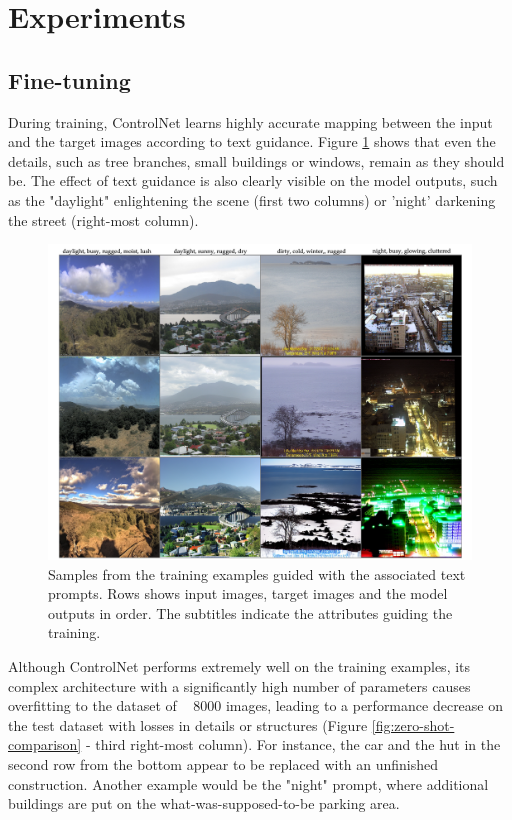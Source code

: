 \section{Experiments}\label{zero-shot-exp}

\subsection{Fine-tuning}
During training, ControlNet learns highly accurate mapping between the input and the target images according to text guidance. Figure \ref{fig:controlnet-train} shows that even the details, such as tree branches, small buildings or windows, remain as they should be. The effect of text guidance is also clearly visible on the model outputs, such as the "daylight" enlightening the scene (first two columns) or 'night' darkening the street (right-most column).
 
\begin{figure}[ht]
  \includegraphics[width=\textwidth]{Chapters/zero-shot-tat-figs/Controlnet2.png}
  \caption{Samples from the training examples guided with the associated text prompts. Rows shows input images, target images and the model outputs in order. The subtitles indicate the attributes guiding the training.}
  \label{fig:controlnet-train}
\end{figure}

Although ControlNet performs extremely well on the training examples, its complex architecture with a significantly high number of parameters causes overfitting to the dataset of ~ 8000 images, leading to a performance decrease on the test dataset with losses in details or structures (Figure \ref{fig:zero-shot-comparison} - third right-most column). For instance, the car and the hut in the second row from the bottom appear to be replaced with an unfinished construction. Another example would be the "night" prompt, where additional buildings are put on the what-was-supposed-to-be parking area.


